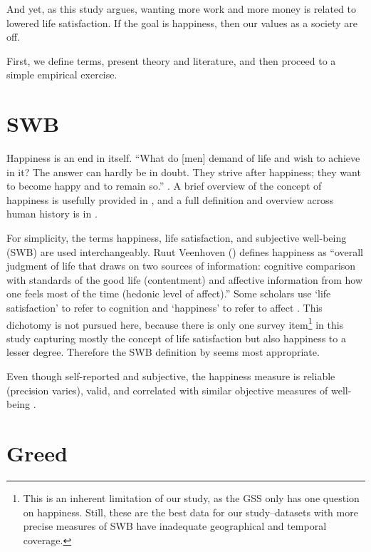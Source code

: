 \documentclass[10pt, letterpaper]{article}
\begin{document}
\begin{spacing}{1.8}
And yet, as this study argues, wanting more work and more money is related to
lowered life satisfaction. If the goal is happiness, then our values as a society are off.

First, we define terms, present theory and literature, and then proceed to a simple empirical exercise.

\section{SWB}


Happiness is an end in itself. ``What do [men] demand of life and wish to
achieve in it? The answer can hardly be in doubt. They strive after happiness;
they want to become happy and to remain so.'' \citep[][p. 52]{freud30}. 
A brief overview of the concept of happiness is usefully provided in
\citet{mcmahon05}, and a full definition and overview across human history is in \citet{mcmahon06}.


For simplicity, the terms happiness, life satisfaction, and
subjective well-being (SWB) are used interchangeably.
Ruut Veenhoven (\citeyear[p. 2]{veenhoven08}) defines happiness as ``overall judgment of life that draws on two sources of information: cognitive comparison with standards of the good life (contentment) and affective information from how one feels most of the time (hedonic level of affect).''
 Some scholars use `life satisfaction' to  refer to cognition and `happiness' to
 refer to affect \citep[e.g.,][]{dorahy98etal}. This dichotomy is not pursued here, because
   there is only one survey item\footnote{This is an inherent limitation of our
     study, as the GSS only has one question on happiness. Still, these are the
     best data for our study--datasets with more precise measures of SWB have
     inadequate geographical and temporal coverage.} in this study capturing mostly
   the concept of life satisfaction but also happiness to a lesser
   degree. Therefore the SWB definition by \citet{veenhoven08} seems most appropriate.
 
Even though self-reported and subjective, the happiness measure is reliable
(precision varies), valid, and correlated with similar objective measures of
well-being \citep{myers00,layard05}.


\section{Greed}


\end{spacing}
\end{document}
